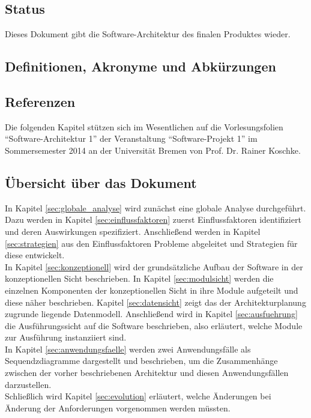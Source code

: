 \documentclass[fontsize=12pt,paper=a4,twoside]{scrartcl}
\begin{document}
\subsection{Status}
Dieses Dokument gibt die Software-Architektur des finalen Produktes wieder.


  
\subsection{Definitionen, Akronyme und Abkürzungen}


\subsection{Referenzen}
Die folgenden Kapitel stützen sich im Wesentlichen auf die Vorlesungsfolien "`Software-Architektur 1"' der Veranstaltung "`Software-Projekt 1"' im Sommersemester 2014 an der Universität Bremen von Prof. Dr. Rainer Koschke.


\subsection{Übersicht über das Dokument}
In Kapitel \ref{sec:globale_analyse} wird zunächst eine globale Analyse durchgeführt. Dazu werden in Kapitel \ref{sec:einflussfaktoren} zuerst Einflussfaktoren identifiziert und deren Auswirkungen spezifiziert. Anschließend werden in Kapitel \ref{sec:strategien} aus den Einflussfaktoren Probleme abgeleitet und Strategien für diese entwickelt. \\
In Kapitel \ref{sec:konzeptionell} wird der grundsätzliche Aufbau der Software in der konzeptionellen Sicht beschrieben. In Kapitel \ref{sec:modulsicht} werden die einzelnen Komponenten der konzeptionellen Sicht in ihre Module aufgeteilt und diese näher beschrieben. Kapitel \ref{sec:datensicht} zeigt das der Architekturplanung zugrunde liegende Datenmodell. Anschließend wird in Kapitel \ref{sec:ausfuehrung} die Ausführungssicht auf die Software beschrieben, also erläutert, welche Module zur Ausführung instanziiert sind. 
\\
In Kapitel \ref{sec:anwendungsfaelle} werden zwei Anwendungsfälle als Sequendzdiagramme dargestellt und beschrieben, um die Zusammenhänge zwischen der vorher beschriebenen Architektur und diesen Anwendungsfällen darzustellen.\\
Schließlich wird Kapitel \ref{sec:evolution} erläutert, welche Änderungen bei Änderung der Anforderungen vorgenommen werden müssten.
\end{document}
